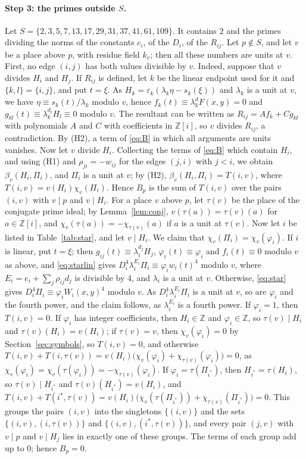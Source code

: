 \documentclass[11pt]{article}
\newcommand{\Z}{\mathbb{Z}}
\begin{document}
\paragraph{Step 3: the primes outside $S$.} Let $S=\{2,3,5,7,13,17,29,31,37,41,61,109\}$. It contains $2$ and the primes dividing the norms of the constants $c_i$, of the $D_i$, of the $R_{ij}$. Let $p\notin S$, and let $v$ be a place above $p$, with residue field $k_v$; then all these numbers are units at $v$. First, no edge $(i,j)$ has both values divisible by $v$. Indeed, suppose that $v$ divides $H_i$ and $H_j$. If $R_{ij}$ is defined, let $k$ be the linear endpoint used for it and $\{k,l\}=\{i,j\}$, and put $t=\xi$. As $H_k=\varepsilon_k(\lambda_k\eta-s_k(\xi))$ and $\lambda_k$ is a unit at $v$, we have $\eta\equiv s_k(t)/\lambda_k$ modulo $v$, hence $f_k(t)\equiv\lambda_k^dF(x,y)=0$ and $g_{kl}(t)\equiv\lambda_k^{d_l}H_l\equiv0$ modulo $v$. The resultant can be written as $R_{ij}=Af_k+Cg_{kl}$ with polynomials $A$ and $C$ with coefficients in $\Z[i]$, so $v$ divides $R_{ij}$, a contradiction. By (H2), a term of \eqref{eq:B} in which all arguments are units vanishes. Now let $v$ divide $H_i$. Collecting the terms of \eqref{eq:B} which contain $H_i$, and using (H1) and $\rho_{ji}=-w_{ij}$ for the edges $(j,i)$ with $j<i$, we obtain $\beta_v(H_i,\Pi_i)$, and $\Pi_i$ is a unit at $v$; by (H2), $\beta_v(H_i,\Pi_i)=T(i,v)$, where $T(i,v)=v(H_i)\chi_v(\Pi_i)$. Hence $B_p$ is the sum of $T(i,v)$ over the pairs $(i,v)$ with $v\mid p$ and $v\mid H_i$. For a place $v$ above $p$, let $\tau(v)$ be the place of the conjugate prime ideal; by Lemma~\ref{lem:conj}, $v(\tau(a))=\tau(v)(a)$ for $a\in\Z[i]$, and $\chi_v(\tau(a))=-\chi_{\tau(v)}(a)$ if $a$ is a unit at $\tau(v)$. Now let $i$ be listed in Table~\ref{tab:star}, and let $v\mid H_i$. We claim that $\chi_v(\Pi_i)=\chi_v(\varphi_i)$. If $i$ is linear, put $t=\xi$; then $g_{ij}(t)\equiv\lambda_i^{d_j}H_j$, $\varphi_i(t)\equiv\varphi_i$ and $f_i(t)\equiv0$ modulo $v$ as above, and \eqref{eq:starlin} gives $D_i^4\lambda_i^{E_i}\Pi_i\equiv\varphi_iw_i(t)^4$ modulo $v$, where $E_i=e_i+\sum_j\rho_{ij}d_j$ is divisible by $4$, and $\lambda_i$ is a unit at $v$. Otherwise, \eqref{eq:star} gives $D_i^4\Pi_i\equiv\varphi_iW_i(x,y)^4$ modulo $v$. As $D_i^4\lambda_i^{E_i}\Pi_i$ is a unit at $v$, so are $\varphi_i$ and the fourth power, and the claim follows, as $\lambda_i^{E_i}$ is a fourth power. If $\varphi_i=1$, then $T(i,v)=0$. If $\varphi_i$ has integer coefficients, then $H_i\in\Z$ and $\varphi_i\in\Z$, so $\tau(v)\mid H_i$ and $\tau(v)(H_i)=v(H_i)$; if $\tau(v)=v$, then $\chi_v(\varphi_i)=0$ by Section~\ref{sec:symbols}, so $T(i,v)=0$, and otherwise $T(i,v)+T(i,\tau(v))=v(H_i)\bigl(\chi_v(\varphi_i)+\chi_{\tau(v)}(\varphi_i)\bigr)=0$, as $\chi_v(\varphi_i)=\chi_v(\tau(\varphi_i))=-\chi_{\tau(v)}(\varphi_i)$. If $\varphi_i=\tau(\Pi_{i^*})$, then $H_{i^*}=\tau(H_i)$, so $\tau(v)\mid H_{i^*}$ and $\tau(v)(H_{i^*})=v(H_i)$, and $T(i,v)+T(i^*,\tau(v))=v(H_i)\bigl(\chi_v(\tau(\Pi_{i^*}))+\chi_{\tau(v)}(\Pi_{i^*})\bigr)=0$. This groups the pairs $(i,v)$ into the singletons $\{(i,v)\}$ and the sets $\{(i,v),(i,\tau(v))\}$ and $\{(i,v),(i^*,\tau(v))\}$, and every pair $(j,v)$ with $v\mid p$ and $v\mid H_j$ lies in exactly one of these groups. The terms of each group add up to $0$; hence $B_p=0$.
\end{document}
